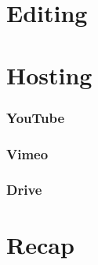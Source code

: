 \documentclass[sigconf]{acmart}
\begin{document}
\subsection{}

\section{Editing}

\section{Hosting}

\subsubsection{YouTube}

\subsubsection{Vimeo}

\subsubsection{Drive}


\section{Recap}
\end{document}
